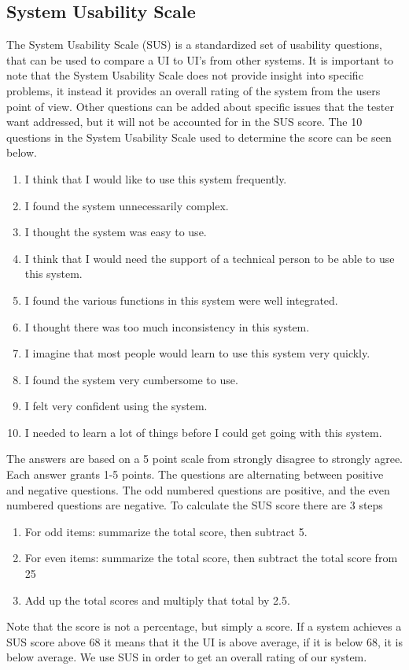 \subsection*{System Usability Scale} \label{SUSScore}
The System Usability Scale (SUS) is a standardized set of usability questions, that can be used to compare a UI to UI's from other systems. It is important to note that the System Usability Scale does not provide insight into specific problems, it instead it provides an overall rating of the system from the users point of view. Other questions can be added about specific issues that the tester want addressed, but it will not be accounted for in the SUS score.\cite{adobeSUS}
The 10 questions in the System Usability Scale used to determine the score can be seen below.
\begin{enumerate}
	\item I think that I would like to use this system frequently.
	\item I found the system unnecessarily complex.
	\item I thought the system was easy to use.
	\item I think that I would need the support of a technical person to be able to use this system.
	\item I found the various functions in this system were well integrated.
	\item I thought there was too much inconsistency in this system.
	\item I imagine that most people would learn to use this system very quickly.
	\item I found the system very cumbersome to use.
	\item I felt very confident using the system.
	\item I needed to learn a lot of things before I could get going with this system.
\end{enumerate}
The answers are based on a 5 point scale from strongly disagree to strongly agree.
Each answer grants 1-5 points.
The questions are alternating between positive and negative questions. The odd numbered questions are positive, and the even numbered questions are negative.\cite{adobeSUS}
To calculate the SUS score there are 3 steps
\begin{enumerate}
	\item For odd items: summarize the total score, then subtract 5.
	\item For even items: summarize the total score, then subtract the total score from 25
	\item Add up the total scores and multiply that total by 2.5.
\end{enumerate}
Note that the score is not a percentage, but simply a score. If a system achieves a SUS score above 68 it means that it the UI is above average, if it is below 68, it is below average. \cite{adobeSUS}
We use SUS in order to get an overall rating of our system.

